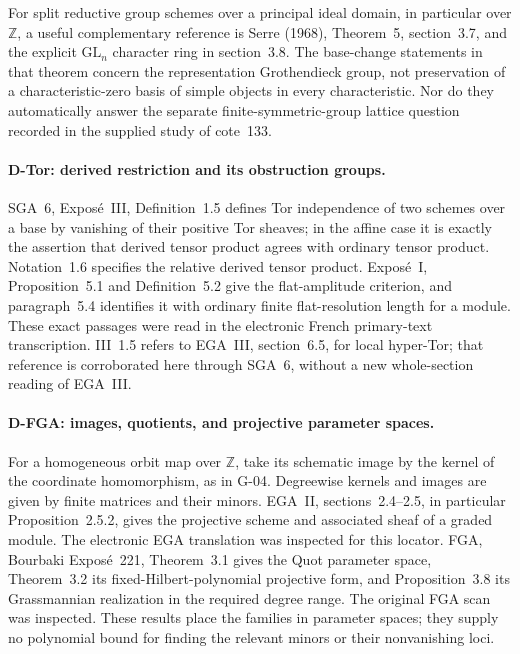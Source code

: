 For split reductive group schemes over a principal ideal domain, in particular over $\mathbb Z$, a useful complementary reference is Serre (1968), Theorem~5, section~3.7, and the explicit $\mathrm{GL}_n$ character ring in section~3.8. The base-change statements in that theorem concern the representation Grothendieck group, not preservation of a characteristic-zero basis of simple objects in every characteristic. Nor do they automatically answer the separate finite-symmetric-group lattice question recorded in the supplied study of cote~133.


\paragraph{D-Tor: derived restriction and its obstruction groups.}
SGA~6, Expos\'e~III, Definition~1.5 defines Tor independence of two
schemes over a base by vanishing of their positive Tor sheaves; in
the affine case it is exactly the assertion that derived tensor
product agrees with ordinary tensor product. Notation~1.6 specifies
the relative derived tensor product. Expos\'e~I, Proposition~5.1
and Definition~5.2 give the flat-amplitude criterion, and paragraph~5.4
identifies it with ordinary finite flat-resolution length for a
module. These exact passages were read in the electronic French
primary-text transcription. III~1.5 refers to EGA~III, section~6.5,
for local hyper-Tor; that reference is corroborated here through
SGA~6, without a new whole-section reading of EGA~III.

\paragraph{D-FGA: images, quotients, and projective parameter spaces.}
For a homogeneous orbit map over $\mathbb Z$, take its schematic image by the kernel of the coordinate homomorphism, as in G-04. Degreewise kernels and images are given by finite matrices and their minors. EGA~II, sections~2.4--2.5, in particular Proposition~2.5.2, gives the projective scheme and associated sheaf of a graded module. The electronic EGA translation was inspected for this locator. FGA, Bourbaki Expos\'e~221, Theorem~3.1 gives the Quot parameter space, Theorem~3.2 its fixed-Hilbert-polynomial projective form, and Proposition~3.8 its Grassmannian realization in the required degree range. The original FGA scan was inspected. These results place the families in parameter spaces; they supply no polynomial bound for finding the relevant minors or their nonvanishing loci.

